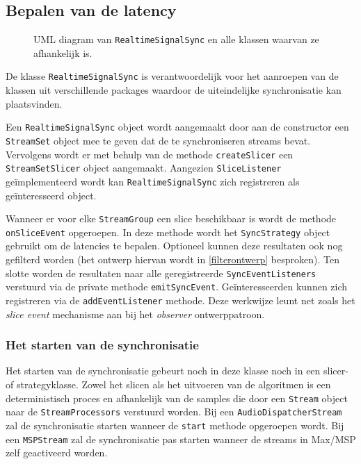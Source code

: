 \subsection{Bepalen van de latency}

\begin{figure}[h!]
	\captionsetup{width=0.7\textwidth}
	\caption[UML diagram van \texttt{RealtimeSignalSync} + afhankelijkheden]{UML diagram van \texttt{RealtimeSignalSync} en alle klassen waarvan ze afhankelijk is.}
	\begin{center}
		\advance\parskip0.3cm
		
	\end{center}
	\label{latencyUML}
\end{figure}

De klasse \texttt{RealtimeSignalSync} is verantwoordelijk voor het aanroepen van de klassen uit verschillende packages waardoor de uiteindelijke synchronisatie kan plaatsvinden.

Een \texttt{RealtimeSignalSync} object wordt aangemaakt door aan de constructor een \texttt{StreamSet} object mee te geven dat de te synchroniseren streams bevat. Vervolgens wordt er met behulp van de methode \texttt{createSlicer} een \texttt{StreamSetSlicer} object aangemaakt. Aangezien \texttt{SliceListener} geïmplementeerd wordt kan \texttt{RealtimeSignalSync} zich registreren als geïnteresseerd object.

Wanneer er voor elke \texttt{StreamGroup} een slice beschikbaar is wordt de methode \texttt{onSliceEvent} opgeroepen. In deze methode wordt het \texttt{SyncStrategy} object gebruikt om de latencies te bepalen. Optioneel kunnen deze resultaten ook nog gefilterd worden (het ontwerp hiervan wordt in \ref{filterontwerp} besproken). Ten slotte worden de resultaten naar alle geregistreerde \texttt{SyncEventListeners} verstuurd via de private methode \texttt{emitSyncEvent}. Geïnteresseerden kunnen zich registreren via de \texttt{addEventListener} methode. Deze werkwijze leunt net zoals het \textit{slice event} mechanisme aan bij het \textit{observer} ontwerppatroon.

\subsubsection{Het starten van de synchronisatie}

Het starten van de synchronisatie gebeurt noch in deze klasse noch in een slicer- of \mbox{strategyklasse}. Zowel het slicen als het uitvoeren van de algoritmen is een deterministisch proces en afhankelijk van de samples die door een \texttt{Stream} object naar de \texttt{StreamProcessors} verstuurd worden. Bij een \texttt{AudioDispatcherStream} zal de synchronisatie starten wanneer de \texttt{start} methode opgeroepen wordt. Bij een \texttt{MSPStream} zal de synchronisatie pas starten wanneer de streams in Max/MSP zelf geactiveerd worden.

